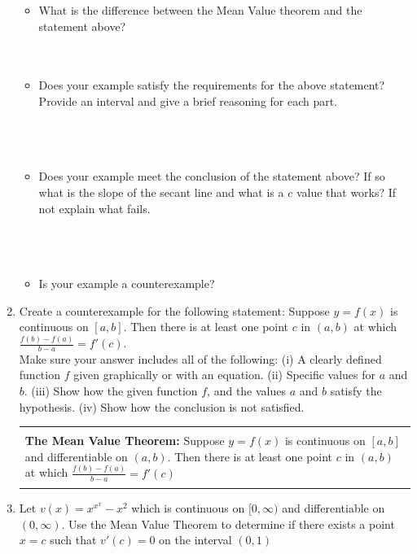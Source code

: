 \documentclass[12pt]{article}
\newenvironment{boxe}
    {\begin{center}
    \begin{tabular}{|p{0.9\textwidth}|}
    \hline\\
    }
    { 
    \\\\\hline
    \end{tabular} 
    \end{center}
    }
\begin{document}
\begin{enumerate}
    \begin{itemize}
        \item What is the difference between the Mean Value theorem and the statement above?\\\\\\
        \item Does your example satisfy the requirements for the above statement? Provide an interval and give a brief reasoning for each part.\\\\\\\\
        \item Does your example meet the conclusion of the statement above? If so what is the slope of the secant line and what is a $c$ value that works? If not explain what fails.\\\\\\\\
        \item Is your example a counterexample?
    \end{itemize}
    \newpage
    \item Create a counterexample for the following statement: Suppose $y=f(x)$ is continuous on $[a,b]$. Then there is at least one point $c$ in $(a,b)$ at which $\displaystyle{\frac{f(b)-f(a)}{b-a}=f'(c)}$.\\
    Make sure your answer includes all of the following: (i) A clearly defined function $f$ given graphically or with an equation. (ii) Specific values for $a$ and $b$. (iii) Show how the given function $f$, and the values $a$ and $b$ satisfy the hypothesis. (iv) Show how the conclusion is not satisfied.
    \vspace{4in}

    \begin{boxe}
        \textbf{The Mean Value Theorem:} Suppose $y=f(x)$ is continuous on $[a,b]$ and differentiable on $(a,b)$. Then there is at least one point $c$ in $(a,b)$ at which $\displaystyle{\frac{f(b)-f(a)}{b-a}=f'(c)}$
    \end{boxe}
    \item Let $v(x)=x^{x^x}-x^2$ which is continuous on $[0,\infty)$ and differentiable on $(0,\infty)$. Use the Mean Value Theorem to determine if there exists a point $x=c$ such that $v'(c)=0$ on the interval $(0,1)$

        
    
\end{enumerate}
\end{document}
